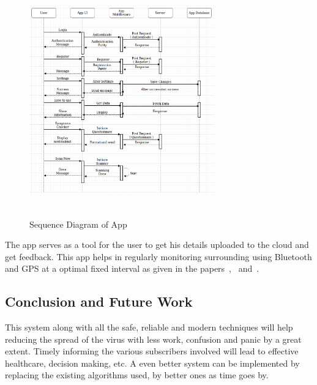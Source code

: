 \documentclass[10pt,twocolumn,letterpaper]{article}
\begin{document}
\begin{figure}[h!]
  \centering
  \includegraphics[width=8cm, height=10cm]{UML_Sequence_App}
  \caption[Caption for LOF]{Sequence Diagram of App\footnotemark}
\end{figure}

\newline\newline
The app serves as a tool for the user to get his details uploaded to the cloud and get feedback.
This app helps in regularly monitoring surrounding using Bluetooth and GPS at a optimal fixed interval as given in the papers~\cite{3},~\cite{4} and~\cite{5}.

\subsection{Conclusion and Future Work}
This system along with all the safe, reliable and modern techniques will help reducing the spread of the virus with less work, confusion and panic by a great extent. Timely informing the various subscribers involved will lead to effective healthcare, decision making, etc. A even better system can be implemented by replacing the existing algorithms used, by better ones as time goes by.

{\small


}
\end{document}
